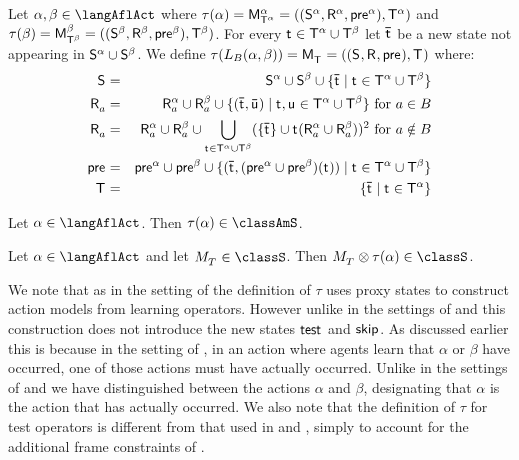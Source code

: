 \begin{definition}[Learning]\label{afl-s-learning}
Let $\alpha, \beta \in \langAflAct$ where $\tau(\alpha) = \aPModel[\alpha]{\aStatesT[\alpha]} = \aPModelTuple[\alpha]{\aStatesT[\alpha]}$ and $\tau(\beta) = \aPModel[\beta]{\aStatesT[\beta]} = \aPModelTuple[\beta]{\aStatesT[\beta]}$.
For every $\aStateT \in \aStatesT[\alpha] \cup \aStatesT[\beta]$ let $\aPStateT$ be a new state not appearing in $\aStates[\alpha] \cup \aStates[\beta]$.
We define $\tau(\learns_\agentsB (\alpha, \beta)) = \aPModel{\aStatesT} = \aPModelTuple{\aStatesT}$ where:
\begin{eqnarray*}
    \aStates &=& \aStates[\alpha] \cup \aStates[\beta] \cup \{\aPStateT \mid \aStateT \in \aStatesT[\alpha] \cup \aStatesT[\beta]\}\\
    \aAccessibility{\agentA} &=& \aAccessibility[\alpha]{\agentA} \cup \aAccessibility[\beta]{\agentA} \cup \{(\aPStateT, \aPStateU) \mid \aStateT, \aStateU \in \aStatesT[\alpha] \cup \aStatesT[\beta]\} \text{ for } \agentA \in \agentsB\\
    \aAccessibility{\agentA} &=& \aAccessibility[\alpha]{\agentA} \cup \aAccessibility[\beta]{\agentA} \cup \bigcup_{\aStateT \in \aStatesT[\alpha] \cup \aStatesT[\beta]} (\{\aPStateT\} \cup \aStateT (\aAccessibility[\alpha]{\agentA} \cup \aAccessibility[\beta]{\agentA}))^2 \text{ for } \agentA \notin \agentsB\\
    \aPrecondition &=& \aPrecondition[\alpha] \cup \aPrecondition[\beta] \cup \{(\aPStateT, (\aPrecondition[\alpha] \cup \aPrecondition[\beta])(\aStateT)) \mid \aStateT \in \aStatesT[\alpha] \cup \aStatesT[\beta]\}\\
    \aStatesT &=& \{\aPStateT \mid \aStateT \in \aStatesT[\alpha]\}
\end{eqnarray*}
\end{definition}

\begin{lemma}\label{afl-s-structure}
Let $\alpha \in \langAflAct$. Then $\tau(\alpha) \in \classAmS$.
\end{lemma}

\begin{lemma}\label{afl-s-exec}
Let $\alpha \in \langAflAct$ and 
let $\kPModel{\kStatesT} \in \classS$.
Then $\kPModel{\kStatesT} \exec \tau(\alpha) \in \classS$.
\end{lemma}

We note that as in the setting of \classKFF{} the definition of $\tau$ uses proxy states to construct action models from learning operators.
However unlike in the settings of \classK{} and \classKFF{} this construction does not introduce the new states $\aStateTest$ and $\aStateSkip$.
As discussed earlier this is because in the setting of \classS{}, in an action where agents learn that $\alpha$ or $\beta$ have occurred, one of those actions must have actually occurred.
Unlike in the settings of \classK{} and \classKFF{} we have distinguished between the actions $\alpha$ and $\beta$, designating that $\alpha$ is the action that has actually occurred.
We also note that the definition of $\tau$ for test operators is different from that used in \classK{} and \classKFF{}, simply to account for the additional frame constraints of \classS{}.

